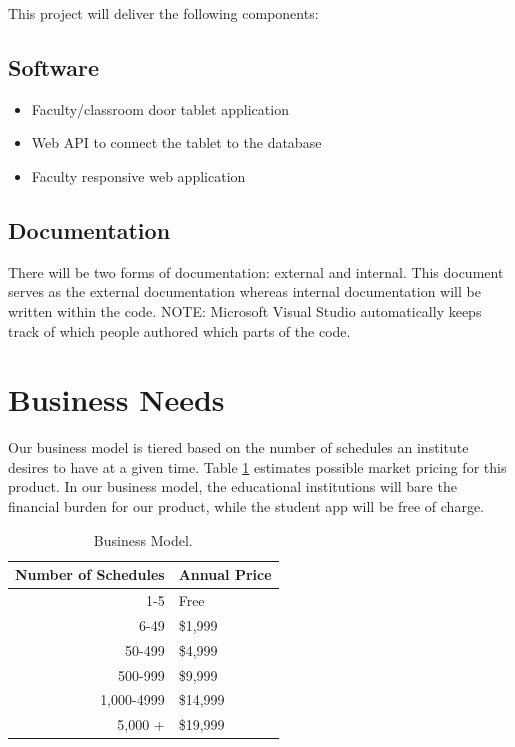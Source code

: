 This project will deliver the following components:

\subsection{Software}

\begin{itemize}
\item Faculty/classroom door tablet application
\item Web API to connect the tablet to the database
\item Faculty responsive web application
\end{itemize}

\subsection{Documentation}
There will be two forms of documentation: external and internal.  This document serves as the external documentation whereas internal documentation will be written within the code. NOTE: Microsoft Visual Studio automatically keeps track of which people authored which parts of the code. 

\section{Business Needs}
Our business model is tiered based on the number of schedules an institute desires to have at a given time. Table \ref{Business Model} estimates possible market pricing for this product. In our business model, the educational institutions will bare the financial burden for our product, while the student app will be free of charge. 
\begin{table}[tbh]
\caption{Business Model. \label{Business Model}}
\begin{center}
\begin{tabular}{|r|l|}
  \hline
  Number of Schedules & Annual Price\\
  \hline
  1-5 & Free \\ \hline
  6-49 & \$1,999 \\
  \hline 
  50-499 & \$4,999 \\
  \hline
  500-999 & \$9,999 \\
  \hline
  1,000-4999 & \$14,999 \\
  \hline
  5,000 + & \$19,999 \\
  \hline
\end{tabular}
\end{center}
\end{table}


